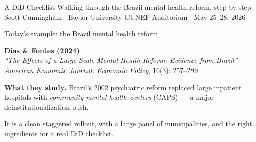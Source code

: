 \documentclass[aspectratio=169,12pt,t]{beamer}
\begin{document}

\codechellatitle
  {A DiD Checklist}
  {Walking through the Brazil mental health reform, step by step}
  {Scott Cunningham \textperiodcentered\ Baylor University}
  {CUNEF Auditorium \textperiodcentered\ May 25--28, 2026}


\begin{frame}{Today's example: the Brazil mental health reform}
\vspace{0.5cm}

\textbf{Dias \& Fontes (2024)} \\
\textit{``The Effects of a Large-Scale Mental Health Reform: Evidence from Brazil''} \\
\textit{American Economic Journal: Economic Policy}, 16(3): 257--289

\vspace{0.7cm}

\textbf{What they study.} \;Brazil's 2002 psychiatric reform replaced large inpatient hospitals with \textit{community mental health centers} (CAPS) --- a major deinstitutionalization push.

\vspace{0.4cm}

 \;It is a clean staggered rollout, with a large panel of municipalities, and the right ingredients for a real DiD checklist.
\end{frame}
\end{document}
